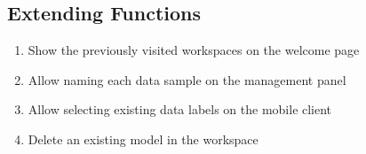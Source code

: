 \subsection{Extending Functions}
\begin{enumerate}[resume*]
    \item Show the previously visited workspaces on the welcome page
    \item Allow naming each data sample on the management panel
    \item Allow selecting existing data labels on the mobile client %
    \item Delete an existing model in the workspace %
\end{enumerate}